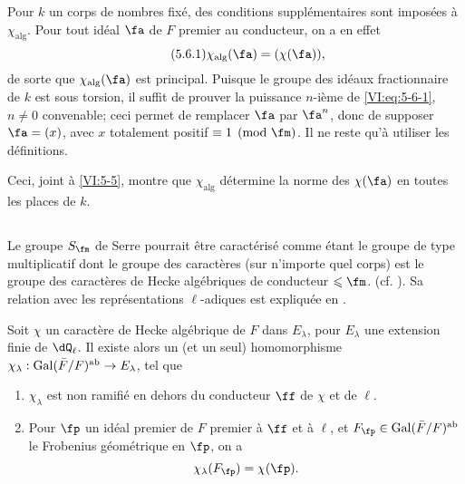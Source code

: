 Pour $k$ un corps de nombres fix\'e, des conditions suppl\'ementaires sont 
impos\'ees \`a $\chi_\text{alg}$. Pour tout id\'eal $\fa$ de $F$ premier au 
conducteur, on a en effet 
\begin{equation*}\tag{5.6.1}\label{VI:eq:5-6-1}
  \chi_\text{alg}(\fa) = (\chi(\fa)) \text{,} 
\end{equation*}
de sorte que $\chi_\text{alg}(\fa)$ est principal. Puisque le groupe des 
id\'eaux fractionnaire de $k$ est sous torsion, il suffit de prouver la 
puissance $n$-i\`eme de \eqref{VI:eq:5-6-1}, $n\ne 0$ convenable; ceci permet 
de remplacer $\fa$ par $\fa^n$, donc de supposer $\fa=(x)$, avec $x$ totalement 
positif $\equiv 1\pmod\fm$. Il ne reste qu'\`a utiliser les d\'efinitions. 

Ceci, joint \`a \ref{VI:5-5}, montre que $\chi_\text{alg}$ d\'etermine la norme 
des $\chi(\fa)$ en toutes les places de $k$. 





\subsection{}\label{VI:5-7}

Le groupe $S_\fm$ de Serre pourrait \^etre caract\'eris\'e comme \'etant le 
groupe de type multiplicatif dont le groupe des caract\`eres (sur n'importe 
quel corps) est le groupe des caract\`eres de Hecke alg\'ebriques de conducteur 
$\leqslant \fm$. (cf. \cite[II 2.1 et 2.2]{se68}). Sa relation avec les 
repr\'esentations $\ell$-adiques est expliqu\'ee en \cite[II 2.3]{se68}. 





\begin{theorem_}[{\cite{se68}}]\label{VI:5-8}
Soit $\chi$ un caract\`ere de Hecke alg\'ebrique de $F$ dans $E_\lambda$, pour 
$E_\lambda$ une extension finie de $\dQ_\ell$. Il existe alors un (et un seul) 
homomorphisme $\chi_\lambda:\operatorname{Gal}(\bar F/F)^\textnormal{ab} \to E_\lambda$, tel 
que 
\begin{enumerate}[\indent (i)]
  \item $\chi_\lambda$ est non ramifi\'e en dehors du conducteur $\ff$ de 
    $\chi$ et de $\ell$. 
  \item Pour $\fp$ un id\'eal premier de $F$ premier \`a $\ff$ et \`a $\ell$, 
    et $F_\fp\in \gal(\bar F/F)^\textnormal{ab}$ le Frobenius g\'eom\'etrique 
    en $\fp$, on a 
    \[
      \chi_\lambda(F_\fp) = \chi(\fp) \text{.}
    \] 
\end{enumerate}
\end{theorem_}





